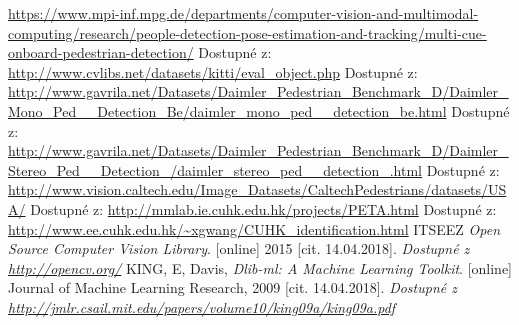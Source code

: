 \begin{thebibliography}{99}
		\url{https://www.mpi-inf.mpg.de/departments/computer-vision-and-multimodal-computing/research/people-detection-pose-estimation-and-tracking/multi-cue-onboard-pedestrian-detection/}
 	 Dostupné z: \url{http://www.cvlibs.net/datasets/kitti/eval_object.php}
 	 Dostupné z: \url{http://www.gavrila.net/Datasets/Daimler_Pedestrian_Benchmark_D/Daimler_Mono_Ped__Detection_Be/daimler_mono_ped__detection_be.html}
 	 Dostupné z: \url{http://www.gavrila.net/Datasets/Daimler_Pedestrian_Benchmark_D/Daimler_Stereo_Ped__Detection_/daimler_stereo_ped__detection_.html}
 	 Dostupné z: \url{http://www.vision.caltech.edu/Image_Datasets/CaltechPedestrians/datasets/USA/}
 	 Dostupné z: \url{http://mmlab.ie.cuhk.edu.hk/projects/PETA.html}
 	 Dostupné z: \url{http://www.ee.cuhk.edu.hk/~xgwang/CUHK_identification.html}
 	 ITSEEZ \textit{Open Source Computer Vision Library}. [online] 2015 [cit. 14.04.2018].
 			\textit{Dostupné z \url{http://opencv.org/}}
 	 KING, E, Davis,  \textit{Dlib-ml: A Machine Learning Toolkit}. [online] Journal of Machine Learning Research,  2009 [cit. 14.04.2018].
 			\textit{Dostupné z \url{http://jmlr.csail.mit.edu/papers/volume10/king09a/king09a.pdf}}
\end{thebibliography}
